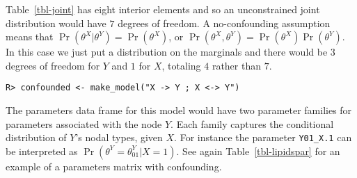 \documentclass[
  11pt,
  article]{jss}
\begin{document}
Table~\ref{tbl-joint} has eight interior elements and so an
unconstrained joint distribution would have \(7\) degrees of freedom. A
no-confounding assumption means that
\(\Pr(\theta^X | \theta^Y) = \Pr(\theta^X)\), or
\(\Pr(\theta^X, \theta^Y) = \Pr(\theta^X)\Pr(\theta^Y)\). In this case
we just put a distribution on the marginals and there would be \(3\)
degrees of freedom for \(Y\) and \(1\) for \(X\), totaling \(4\) rather
than \(7\).

\begin{verbatim}
R> confounded <- make_model("X -> Y ; X <-> Y")
\end{verbatim}

\hypertarget{tbl-confound-params-df}{}
\begin{table}[H]
\caption{\label{tbl-confound-params-df}Parameters data frame for model with confounding. }\tabularnewline

\centering
{}
\end{table}

The parameters data frame for this model would have two parameter
families for parameters associated with the node \(Y\). Each family
captures the conditional distribution of \(Y\)'s nodal types, given
\(X\). For instance the parameter \texttt{Y01\_X.1} can be interpreted
as \(\Pr(\theta^Y = \theta^Y_{01} | X=1)\). See again
Table~\ref{tbl-lipidspar} for an example of a parameters matrix with
confounding.
\end{document}
